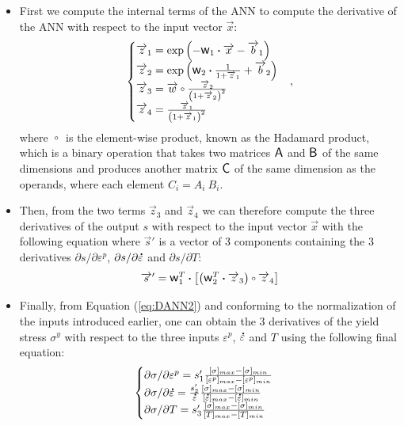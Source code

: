 \documentclass[algorithms,article,submit,pdftex,moreauthors]{Definitions/mdpi}
\DeclareRobustCommand{\w}{\mbox{\large\ensuremath{\mathsf{w}}}}
\DeclareRobustCommand{\A}{\mbox{\large\ensuremath{\mathsf{A}}}}
\DeclareRobustCommand{\B}{\mbox{\large\ensuremath{\mathsf{B}}}}
\DeclareRobustCommand{\C}{\mbox{\large\ensuremath{\mathsf{C}}}}
\DeclareRobustCommand{\dotp}{\boldsymbol{\cdot}}
\DeclareRobustCommand{\ccirc}{\kern0.5ex\vcenter{\hbox{$\scriptstyle\circ$}}\kern0.5ex}
\DeclareRobustCommand{\mdot}[1]{\accentset{\mbox{\bfseries .}}{#1}}
\begin{document}
\begin{itemize}
\item First we compute the internal terms of the ANN to compute the derivative of the ANN with respect to the input vector $\overrightarrow{x}$:
\begin{equation}
\begin{cases}
\overrightarrow{z}_1 = \exp{\left(- \w_1 \dotp \overrightarrow{x}- \overrightarrow{b}_1\right)}\\
\overrightarrow{z}_2 = \exp{\left(\w_2 \dotp \frac{1}{1+\overrightarrow{z}_1} + \overrightarrow{b}_2\right)}\\
\overrightarrow{z}_3 = \overrightarrow{w} \ccirc \frac{ \overrightarrow{z}_2}{\left(1 + \overrightarrow{z}_2\right)^2}\\
\overrightarrow{z}_4 = \frac{\overrightarrow{z}_1}{\left(1+\overrightarrow{z}_1\right)^2}
\end{cases},
\label{eq:DANN1}
\end{equation}
where $\ccirc$ is the element-wise product, known as the Hadamard product, which is a binary operation that takes two matrices $\A$ and $\B$ of the same dimensions and produces another matrix $\C$ of the same dimension as the operands, where each element $C_i=A_i~B_i$.
\item Then, from the two terms $\overrightarrow{z}_3$ and $\overrightarrow{z}_4$ we can therefore compute the three derivatives of the output $s$ with respect to the input vector $\overrightarrow{x}$ with the following equation where $\overrightarrow{s}'$ is a vector of $3$ components containing the $3$ derivatives $\partial s/\partial\varepsilon^p$, $\partial s/\partial\mdot\varepsilon$ and $\partial s/\partial T$:
\begin{equation}
\overrightarrow{s}' = \w_1^T \dotp \left[\left(\w_2^T \dotp \overrightarrow{z}_3 \right) \ccirc \overrightarrow{z}_4\right]\label{eq:DANN2}
\end{equation}
\item Finally, from Equation (\ref{eq:DANN2}) and conforming to the normalization of the inputs introduced earlier, one can obtain the $3$ derivatives of the yield stress $\sigma^y$ with respect to the three inputs $\varepsilon^p$, $\mdot\varepsilon$ and $T$ using the following final equation:
\begin{equation}
\begin{cases}
\partial \sigma/\partial \varepsilon^p = s'_1 \frac{[\sigma]_{max} -[\sigma]_{min}}{[\varepsilon^p]_{max} -[\varepsilon^p]_{min}}\\
\partial \sigma/\partial\mdot\varepsilon = \frac{s'_2}{\mdot\varepsilon} \frac{[\sigma]_{max} -[\sigma]_{min}}{[\mdot\varepsilon]_{max} -[\mdot\varepsilon]_{min}} \\
\partial \sigma/\partial T = s'_3 \frac{[\sigma]_{max} -[\sigma]_{min}}{[T]_{max} -[T]_{min}}
\end{cases}
\label{eq:DANN3}
\end{equation}
\end{itemize}
\end{document}
